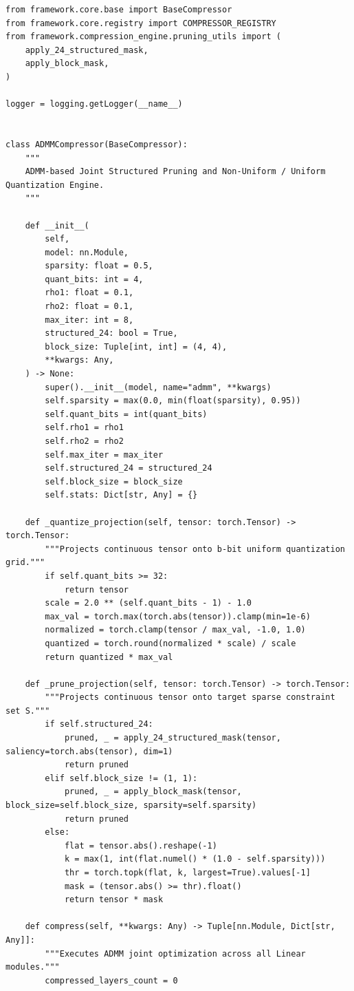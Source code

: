 \begin{lstlisting}
from framework.core.base import BaseCompressor
from framework.core.registry import COMPRESSOR_REGISTRY
from framework.compression_engine.pruning_utils import (
    apply_24_structured_mask,
    apply_block_mask,
)

logger = logging.getLogger(__name__)


class ADMMCompressor(BaseCompressor):
    """
    ADMM-based Joint Structured Pruning and Non-Uniform / Uniform Quantization Engine.
    """

    def __init__(
        self,
        model: nn.Module,
        sparsity: float = 0.5,
        quant_bits: int = 4,
        rho1: float = 0.1,
        rho2: float = 0.1,
        max_iter: int = 8,
        structured_24: bool = True,
        block_size: Tuple[int, int] = (4, 4),
        **kwargs: Any,
    ) -> None:
        super().__init__(model, name="admm", **kwargs)
        self.sparsity = max(0.0, min(float(sparsity), 0.95))
        self.quant_bits = int(quant_bits)
        self.rho1 = rho1
        self.rho2 = rho2
        self.max_iter = max_iter
        self.structured_24 = structured_24
        self.block_size = block_size
        self.stats: Dict[str, Any] = {}

    def _quantize_projection(self, tensor: torch.Tensor) -> torch.Tensor:
        """Projects continuous tensor onto b-bit uniform quantization grid."""
        if self.quant_bits >= 32:
            return tensor
        scale = 2.0 ** (self.quant_bits - 1) - 1.0
        max_val = torch.max(torch.abs(tensor)).clamp(min=1e-6)
        normalized = torch.clamp(tensor / max_val, -1.0, 1.0)
        quantized = torch.round(normalized * scale) / scale
        return quantized * max_val

    def _prune_projection(self, tensor: torch.Tensor) -> torch.Tensor:
        """Projects continuous tensor onto target sparse constraint set S."""
        if self.structured_24:
            pruned, _ = apply_24_structured_mask(tensor, saliency=torch.abs(tensor), dim=1)
            return pruned
        elif self.block_size != (1, 1):
            pruned, _ = apply_block_mask(tensor, block_size=self.block_size, sparsity=self.sparsity)
            return pruned
        else:
            flat = tensor.abs().reshape(-1)
            k = max(1, int(flat.numel() * (1.0 - self.sparsity)))
            thr = torch.topk(flat, k, largest=True).values[-1]
            mask = (tensor.abs() >= thr).float()
            return tensor * mask

    def compress(self, **kwargs: Any) -> Tuple[nn.Module, Dict[str, Any]]:
        """Executes ADMM joint optimization across all Linear modules."""
        compressed_layers_count = 0


\end{lstlisting}
